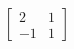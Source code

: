 \documentclass[preview]{standalone}
\begin{document}
\begin{align*}
\begin{bmatrix} 2 & 1 \\ -1 & 1 \end{bmatrix}
\end{align*}
\end{document}
